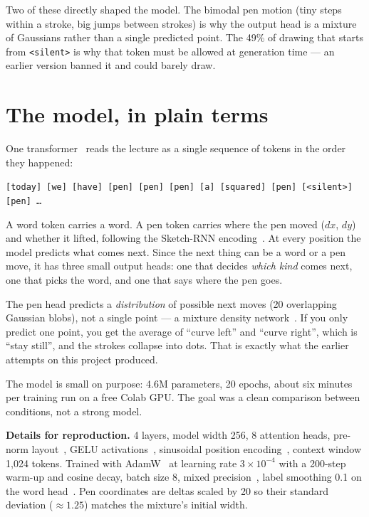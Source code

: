 \documentclass[11pt]{article}
\newcommand{\cond}[1]{\texttt{#1}}
\newcommand{\guidebox}[1]{%
  \noindent\colorbox{boxbg}{\parbox{\dimexpr\linewidth-2\fboxsep}{\small #1}}\par\medskip}
\begin{document}
Two of these directly shaped the model. The bimodal pen motion (tiny steps within a stroke, big jumps between strokes) is why the output head is a mixture of Gaussians rather than a single predicted point. The 49\% of drawing that starts from \cond{<silent>} is why that token must be allowed at generation time --- an earlier version banned it and could barely draw.

\section{The model, in plain terms}

One transformer~\citep{vaswani2017attention} reads the lecture as a single sequence of tokens in the order they happened:
\begin{center}
\texttt{[today] [we] [have] [pen] [pen] [pen] [a] [squared] [pen] [<silent>] [pen] \ldots}
\end{center}
A word token carries a word. A pen token carries where the pen moved ($dx$, $dy$) and whether it lifted, following the Sketch-RNN encoding~\citep{ha2018sketchrnn}. At every position the model predicts what comes next. Since the next thing can be a word or a pen move, it has three small output heads: one that decides \emph{which kind} comes next, one that picks the word, and one that says where the pen goes.

The pen head predicts a \emph{distribution} of possible next moves (20 overlapping Gaussian blobs), not a single point --- a mixture density network~\citep{bishop1994mdn,graves2013generating}. If you only predict one point, you get the average of ``curve left'' and ``curve right'', which is ``stay still'', and the strokes collapse into dots. That is exactly what the earlier attempts on this project produced.

The model is small on purpose: 4.6M parameters, 20 epochs, about six minutes per training run on a free Colab GPU. The goal was a clean comparison between conditions, not a strong model.

\guidebox{%
\textbf{Details for reproduction.} 4 layers, model width 256, 8 attention heads, pre-norm layout~\citep{xiong2020prenorm}, GELU activations~\citep{hendrycks2016gelu}, sinusoidal position encoding~\citep{vaswani2017attention}, context window 1,024 tokens. Trained with AdamW~\citep{loshchilov2019adamw} at learning rate $3\times10^{-4}$ with a 200-step warm-up and cosine decay, batch size 8, mixed precision~\citep{micikevicius2018mixed}, label smoothing 0.1 on the word head~\citep{szegedy2016inception}. Pen coordinates are deltas scaled by 20 so their standard deviation ($\approx 1.25$) matches the mixture's initial width.}
\end{document}
